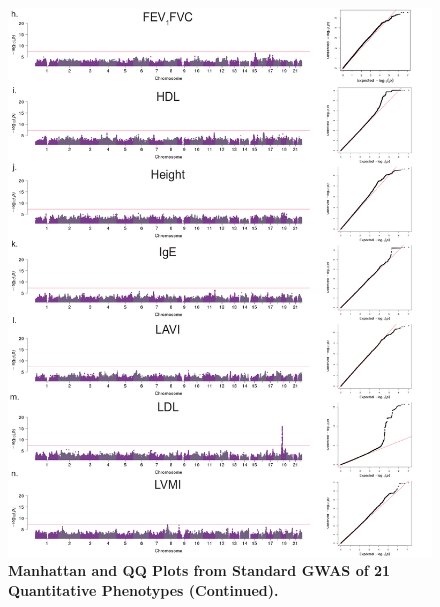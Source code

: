 \begin{figure}[!htb]
	\ContinuedFloat
	\centering
		\includegraphics[width=5in]{img/ch02/fig-s1b.pdf}
\caption[Manhattan and QQ Plots from Standard GWAS of 21 Quantitative Phenotypes (Continued).]{\textbf{Manhattan and QQ Plots from Standard GWAS of 21 Quantitative Phenotypes (Continued).} }
\label{fig:fig-s1b}
\end{figure}

